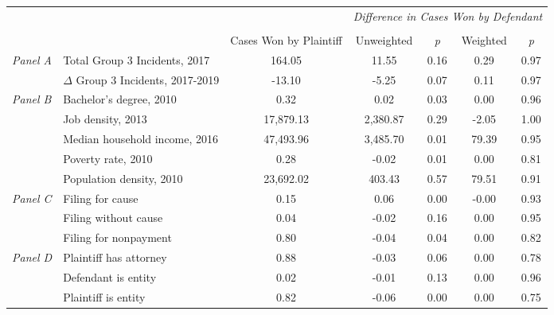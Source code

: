 \begin{tabular}{llccccc}
\toprule
 &  & \textit{} & \multicolumn{4}{c}{\textit{Difference in Cases Won by Defendant}} \\
\cline{4-7}
\\
 &  & Cases Won by Plaintiff & Unweighted & \emph{p} & Weighted & \emph{p} \\
\midrule
\multirow[c]{2}{.75cm}{\textit{Panel A}} & Total Group 3 Incidents, 2017 & 164.05 & 11.55 & 0.16 & 0.29 & 0.97 \\
 & $\Delta$ Group 3 Incidents, 2017-2019 & -13.10 & -5.25 & 0.07 & 0.11 & 0.97 \\
\cline{1-7}
\multirow[c]{5}{.75cm}{\textit{Panel B}} & Bachelor's degree, 2010 & 0.32 & 0.02 & 0.03 & 0.00 & 0.96 \\
 & Job density, 2013 & 17,879.13 & 2,380.87 & 0.29 & -2.05 & 1.00 \\
 & Median household income, 2016 & 47,493.96 & 3,485.70 & 0.01 & 79.39 & 0.95 \\
 & Poverty rate, 2010 & 0.28 & -0.02 & 0.01 & 0.00 & 0.81 \\
 & Population density, 2010 & 23,692.02 & 403.43 & 0.57 & 79.51 & 0.91 \\
\cline{1-7}
\multirow[c]{3}{.75cm}{\textit{Panel C}} & Filing for cause & 0.15 & 0.06 & 0.00 & -0.00 & 0.93 \\
 & Filing without cause & 0.04 & -0.02 & 0.16 & 0.00 & 0.95 \\
 & Filing for nonpayment & 0.80 & -0.04 & 0.04 & 0.00 & 0.82 \\
\cline{1-7}
\multirow[c]{3}{.75cm}{\textit{Panel D}} & Plaintiff has attorney & 0.88 & -0.03 & 0.06 & 0.00 & 0.78 \\
 & Defendant is entity & 0.02 & -0.01 & 0.13 & 0.00 & 0.96 \\
 & Plaintiff is entity & 0.82 & -0.06 & 0.00 & 0.00 & 0.75 \\
\cline{1-7}
\bottomrule
\end{tabular}
